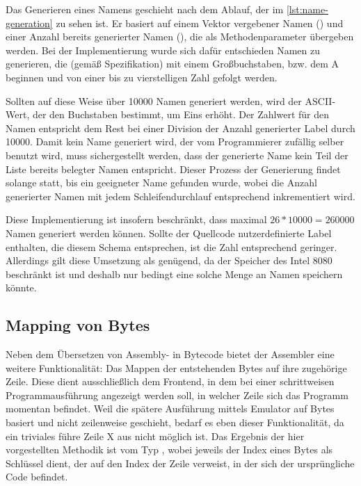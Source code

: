 Das Generieren eines Namens geschieht nach dem Ablauf, der im \cref{lst:name-generation} zu sehen ist. Er basiert auf einem Vektor vergebener Namen () und einer Anzahl bereits generierter Namen (), die als Methodenparameter übergeben werden. Bei der Implementierung wurde sich dafür entschieden Namen zu generieren, die (gemäß Spezifikation) mit einem Großbuchstaben, bzw. dem \glqq A\grqq{} beginnen und von einer bis zu vierstelligen Zahl gefolgt werden.

Sollten auf diese Weise über 10000 Namen generiert werden, wird der ASCII-Wert, der den Buchstaben bestimmt, um Eins erhöht. Der Zahlwert für den Namen entspricht dem Rest bei einer Division der Anzahl generierter Label durch 10000. Damit kein Name generiert wird, der vom Programmierer zufällig selber benutzt wird, muss sichergestellt werden, dass der generierte Name kein Teil der Liste bereits belegter Namen entspricht. Dieser Prozess der Generierung findet solange statt, bis ein geeigneter Name gefunden wurde, wobei die Anzahl generierter Namen mit jedem Schleifendurchlauf entsprechend inkrementiert wird.

Diese Implementierung ist insofern beschränkt, dass maximal $26 * 10000 = 260000$ Namen generiert werden können. Sollte der Quellcode nutzerdefinierte Label enthalten, die diesem Schema entsprechen, ist die Zahl entsprechend geringer. Allerdings gilt diese Umsetzung als genügend, da der Speicher des Intel 8080 beschränkt ist und deshalb nur bedingt eine solche Menge an Namen speichern könnte.

\subsection{Mapping von Bytes}

Neben dem Übersetzen von Assembly- in Bytecode bietet der Assembler eine weitere Funktionalität: Das Mappen der entstehenden Bytes auf ihre zugehörige Zeile. Diese dient ausschließlich dem Frontend, in dem bei einer schrittweisen Programmausführung angezeigt werden soll, in welcher Zeile sich das Programm momentan befindet. Weil die spätere Ausführung mittels Emulator auf Bytes basiert und nicht zeilenweise geschieht, bedarf es eben dieser Funktionalität, da ein triviales \glqq führe Zeile X aus\grqq{} nicht möglich ist. Das Ergebnis der hier vorgestellten Methodik ist vom Typ , wobei jeweils der Index eines Bytes als Schlüssel dient, der auf den Index der Zeile verweist, in der sich der ursprüngliche Code befindet.

